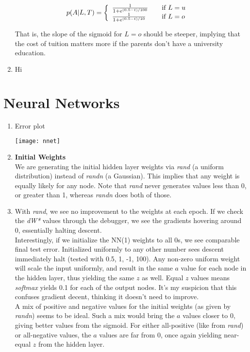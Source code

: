 \documentclass{article}
\begin{document}
\begin{enumerate}
  \begin{align*}
    p(A|L,T) &= \left\{
    \begin{array}{l l}
      \frac{1}{1 + e^{(0.5 - t)/100}} & \quad \text{if $L = u$}\\
      \frac{1}{1 + e^{(0.5 - t)/10}} & \quad \text{if $L = o$}\\
    \end{array} \right.
  \end{align*}

  That is, the slope of the sigmoid for $L = o$ should be steeper,
  implying that the cost of tuition matters more if the parents
  don't have a university education.
  
\item Hi
\end{enumerate}

\section{Neural Networks}

\begin{enumerate}
\item Error plot
  \begin{center}
    \texttt{[image: nnet]}
  \end{center}

\item \textbf{Initial Weights}\\
  We are generating the initial hidden layer weights via \emph{rand}
  (a uniform distribution) instead of \emph{randn} (a Gaussian). This
  implies that any weight is equally likely for any node. Note that
  \emph{rand} never generates values less than 0, or greater than 1,
  whereas \emph{randn} does both of those.

\item With \emph{rand}, we see no improvement
  to the weights at each epoch. If we check the \emph{dW*} values through
  the debugger, we see the gradients hovering around
  0, essentially halting descent.\\
  Interestingly, if we initialize the NN(1) weights to all 0s, we see
  comparable final test error. Initialized uniformly to any other number
  sees descent immediately halt (tested with 0.5, 1, -1, 100). Any non-zero
  uniform weight will scale the input uniformly, and result in the same
  $a$ value for each node in the hidden layer, thus yielding the same $z$
  as well. Equal $z$ values means \emph{softmax} yields 0.1 for each of
  the output nodes. It's my suspicion that this confuses gradient decent,
  thinking it doesn't need to improve.\\
  A mix of positive and negative values for the initial weights (as given
  by \emph{randn}) seems to be ideal. Such a mix would bring the $a$ values
  closer to 0, giving better values from the sigmoid. For either all-positive
  (like from \emph{rand}) or all-negative values, the $a$ values are far
  from 0, once again yielding near-equal $z$ from the hidden layer.
\end{enumerate}
\end{document}
